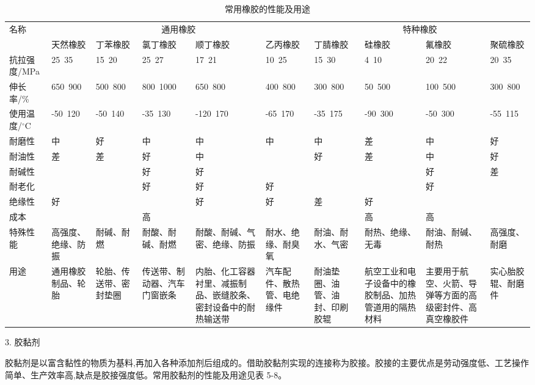\documentclass[UTF8]{ctexbook}
\newcommand{\◎}{\ensuremath{\bigcirc}}
\begin{document}
\begin{table}[H]
\centering
\caption{常用橡胶的性能及用途}
\label{tab:rubber_properties}
\footnotesize\setlength{\tabcolsep}{2pt}
\begin{tabular}{|p{1.8cm}|p{1.5cm}|p{1.5cm}|p{1.2cm}|p{1.8cm}|p{1.5cm}|p{1.5cm}|p{1.8cm}|p{1.8cm}|p{1.2cm}|}
\hline
\multirow{2}{1.8cm}{名称} & \multicolumn{5}{c|}{通用橡胶} & \multicolumn{4}{c|}{特种橡胶} \\
\cline{2-10}
 & 天然橡胶 & 丁苯橡胶 & 氯丁橡胶 & 顺丁橡胶 & 乙丙橡胶 & 丁腈橡胶 & 硅橡胶 & 氟橡胶 & 聚硫橡胶 \\
\hline
抗拉强度/MPa & 25~35 & 15~20 & 25~27 & 17~21 & 10~25 & 15~30 & 4~10 & 20~22 & 20~35 \\
\hline
伸长率/\% & 650~900 & 500~800 & 800~1000 & 650~800 & 400~800 & 300~800 & 50~500 & 100~500 & 300~800 \\
\hline
使用温度/$^\circ$C & -50~120 & -50~140 & -35~130 & -120~170 & -65~170 & -35~175 & -90~300 & -50~300 & -55~115 \\
\hline
耐磨性 & 中 & 好 & 中 & 中 & 中 & 中 & 差 & 中 & 好 \\
\hline
耐油性 & 差 & 差 & 好 & 中 & & 好 & 差 & 中 & 好 \\
\hline
耐碱性 & & & 好 & 好 & & & & 好 & 差 \\
\hline
耐老化 & & & 好 & 好 & 好 & & & 好 & \\
\hline
绝缘性 & 好 & & & 好 & 好 & 差 & 好 & & \\
\hline
成本 & & & 高 & & & & 高 & 高 & \\
\hline
特殊性能 & 高强度、绝缘、防振 & 耐碱、耐燃 & 耐酸、耐碱、耐燃 & 耐酸、耐碱、气密、绝缘、防振 & 耐水、绝缘、耐臭氧 & 耐油、耐水、气密 & 耐热、绝缘、无毒 & 耐油、耐碱、耐热 & 高强度、耐磨 \\
\hline
用途 & 通用橡胶制品、轮胎 & 轮胎、传送带、密封垫圈 & 传送带、制动器、汽车门窗嵌条 & 内胎、化工容器衬里、减振制品、嵌缝胶条、密封设备中的耐热输送带 & 汽车配件、散热管、电绝缘件 & 耐油垫圈、油管、油封、印刷胶辊 & 航空工业和电子设备中的橡胶制品、加热管道用的隔热材料 & 主要用于航空、火箭、导弹等方面的高级密封件、高真空橡胶件 & 实心胎胶辊、耐磨件 \\
\hline
\end{tabular}\end{table}

3. 胶黏剂

胶黏剂是以富含黏性的物质为基料,再加入各种添加剂后组成的。借助胶黏剂实现的连接称为胶接。胶接的主要优点是劳动强度低、工艺操作简单、生产效率高,缺点是胶接强度低。常用胶黏剂的性能及用途见表 5-8。
\end{document}

